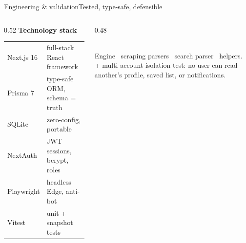 \documentclass[aspectratio=169,11pt]{beamer}
\begin{document}
\begin{frame}{Engineering \& validation}{Tested, type-safe, defensible}
\begin{columns}[T]
\begin{column}{0.52\textwidth}
  {\color{ink}\bfseries\small Technology stack}\\[5pt]
  {\scriptsize
  \renewcommand{\arraystretch}{1.3}
  \begin{tabular}{@{}p{2.2cm} p{4.0cm}@{}}
  Next.js 16 & full-stack React framework \\
  Prisma 7 & type-safe ORM, schema = truth \\
  SQLite & zero-config, portable \\
  NextAuth & JWT sessions, bcrypt, roles \\
  Playwright & headless Edge, anti-bot \\
  Vitest & unit + snapshot tests \\
  \end{tabular}}
\end{column}
\begin{column}{0.48\textwidth}
  \centering
  \\[8pt]
  {\color{sec}\scriptsize Engine \textbullet\ scraping parsers \textbullet\ search parser \textbullet\ helpers.}\\[4pt]
  {\color{sec}\scriptsize + multi-account isolation test: no user can read another's profile, saved list, or notifications.}
\end{column}
\end{columns}
\end{frame}
\end{document}
